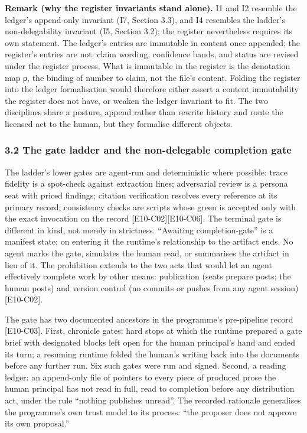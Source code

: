 \documentclass[
  11pt,
]{article}
\begin{document}
\textbf{Remark (why the register invariants stand alone).} I1 and I2
resemble the ledger's append-only invariant (I7, Section 3.3), and I4
resembles the ladder's non-delegability invariant (I5, Section 3.2); the
register nevertheless requires its own statement. The ledger's entries
are immutable in content once appended; the register's entries are not:
claim wording, confidence bands, and status are revised under the
register process. What is immutable in the register is the denotation
map ρ, the binding of number to claim, not the file's content. Folding
the register into the ledger formalisation would therefore either assert
a content immutability the register does not have, or weaken the ledger
invariant to fit. The two disciplines share a posture, append rather
than rewrite history and route the licensed act to the human, but they
formalise different objects.

\subsubsection{3.2 The gate ladder and the non-delegable completion
gate}\label{the-gate-ladder-and-the-non-delegable-completion-gate}

The ladder's lower gates are agent-run and deterministic where possible:
trace fidelity is a spot-check against extraction lines; adversarial
review is a persona seat with priced findings; citation verification
resolves every reference at its primary record; consistency checks are
scripts whose green is accepted only with the exact invocation on the
record {[}E10-C02{]}{[}E10-C06{]}. The terminal gate is different in
kind, not merely in strictness. ``Awaiting completion-gate'' is a
manifest state; on entering it the runtime's relationship to the
artifact ends. No agent marks the gate, simulates the human read, or
summarises the artifact in lieu of it. The prohibition extends to the
two acts that would let an agent effectively complete work by other
means: publication (seats prepare posts; the human posts) and version
control (no commits or pushes from any agent session) {[}E10-C02{]}.

The gate has two documented ancestors in the programme's pre-pipeline
record {[}E10-C03{]}. First, chronicle gates: hard stops at which the
runtime prepared a gate brief with designated blocks left open for the
human principal's hand and ended its turn; a resuming runtime folded the
human's writing back into the documents before any further run. Six such
gates were run and signed. Second, a reading ledger: an append-only file
of pointers to every piece of produced prose the human principal has not
read in full, read to completion before any distribution act, under the
rule ``nothing publishes unread''. The recorded rationale generalises
the programme's own trust model to its process: ``the proposer does not
approve its own proposal.''
\end{document}
